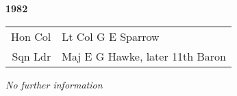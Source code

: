 \begin{center}
  \Huge
  \textbf{1982}
\end{center}

\begin{center}
  \small
  \begin{tabular}{rl}
    Hon Col & Lt Col G E Sparrow \\
    Sqn Ldr & Maj E G Hawke, later 11th Baron \\
  \end{tabular}
\end{center}

\begin{center}
  \textit{No further information}
\end{center}

\vspace{50mm}

\pagebreak
